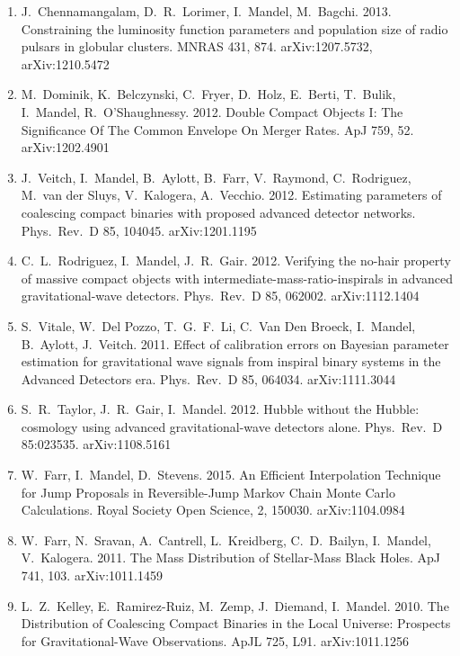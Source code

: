 \documentclass[margin,line]{res}
\begin{document}
\begin{resume}
\begin{enumerate}
\item  J.~Chennamangalam, D.~R.~Lorimer, I.~Mandel, M.~Bagchi.  2013. Constraining the luminosity function parameters and population size of radio pulsars in globular clusters.  MNRAS 431, 874.  arXiv:1207.5732, arXiv:1210.5472

\item  M.~Dominik, K.~Belczynski, C.~Fryer, D.~Holz, E.~Berti, T.~Bulik, I.~Mandel, R.~O'Shaughnessy.  2012.  Double Compact Objects I: The Significance Of The Common Envelope On Merger Rates.  ApJ 759, 52.  arXiv:1202.4901

\item  J.~Veitch, I.~Mandel, B.~Aylott, B.~Farr, V.~Raymond, C.~Rodriguez, M.~van der Sluys, V.~Kalogera, A.~Vecchio.  2012.  Estimating parameters of coalescing compact binaries with proposed advanced detector networks. Phys.~Rev.~D 85, 104045. arXiv:1201.1195

\item  C.~L.~Rodriguez, I.~Mandel, J.~R.~Gair.  2012. Verifying the no-hair property of massive compact objects with intermediate-mass-ratio-inspirals in advanced gravitational-wave detectors. Phys.~Rev.~D 85, 062002. arXiv:1112.1404

\item  S.~Vitale, W.~Del Pozzo, T.~G.~F.~Li, C.~Van Den Broeck, I.~Mandel, B.~Aylott, J.~Veitch.  2011.  Effect of calibration errors on Bayesian parameter estimation for gravitational wave signals from inspiral binary systems in the Advanced Detectors era.  Phys.~Rev.~D 85, 064034. arXiv:1111.3044
 
\item  S.~R.~Taylor, J.~R.~Gair, I.~Mandel. 2012. Hubble without the Hubble: cosmology using advanced gravitational-wave detectors alone. Phys.~Rev.~D 85:023535. arXiv:1108.5161 

\item  W.~Farr, I.~Mandel, D.~Stevens. 2015.  An Efficient Interpolation Technique for Jump Proposals in Reversible-Jump Markov Chain Monte Carlo Calculations.  Royal Society Open Science, 2, 150030. arXiv:1104.0984

\item  W.~Farr, N.~Sravan, A.~Cantrell, L.~Kreidberg, C.~D.~Bailyn, I.~Mandel, V.~Kalogera. 2011. The Mass Distribution of Stellar-Mass Black Holes. ApJ 741, 103. arXiv:1011.1459

\item  L.~Z.~Kelley, E.~Ramirez-Ruiz, M.~Zemp, J.~Diemand, I.~Mandel. 2010. The Distribution of Coalescing Compact Binaries in the Local Universe: Prospects for Gravitational-Wave Observations. ApJL 725, L91.  arXiv:1011.1256


\end{enumerate}
\end{resume}
\end{document}
